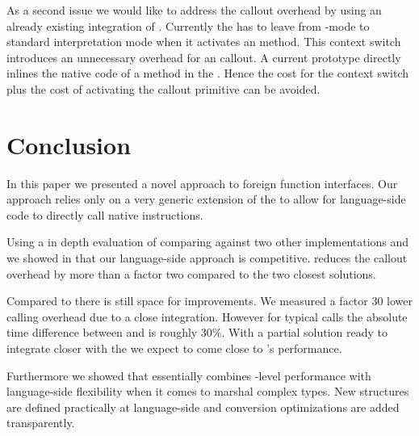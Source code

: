 As a second issue we would like to address the callout overhead by using an already existing \JIT integration of \NB.
Currently the \VM has to leave from \JIT-mode to standard interpretation mode when it activates an \NB method.
This context switch introduces an unnecessary overhead for an \FFI callout.
A current prototype directly inlines the native code of a \NB method in the \JIT.
Hence the cost for the context switch plus the cost of activating the \NB callout primitive can be avoided.



\section{Conclusion}
In this paper we presented \NB a novel approach to foreign function interfaces.
Our approach relies only on a very generic extension of the \VM to allow for language-side code to directly call native instructions.

Using a in depth evaluation of \NB comparing against two other \ST \FFI implementations and \LuaJIT we showed in  that our language-side approach is competitive.
\NB reduces the callout overhead by more than a factor two compared to the two closest \ST solutions.

Compared to \LuaJIT there is still space for improvements.
We measured a factor 30 lower calling overhead due to a close \JIT integration.
However for typical \FFI calls the absolute time difference between \NB and \Lua is roughly $30\%$.
With a partial solution ready to integrate \NB closer with the \JIT we expect to come close to \Lua's performance.

Furthermore we showed that \NB essentially combines \VM-level performance with language-side flexibility when it comes to marshal complex types.
New structures are defined practically at language-side and conversion optimizations are added transparently.


